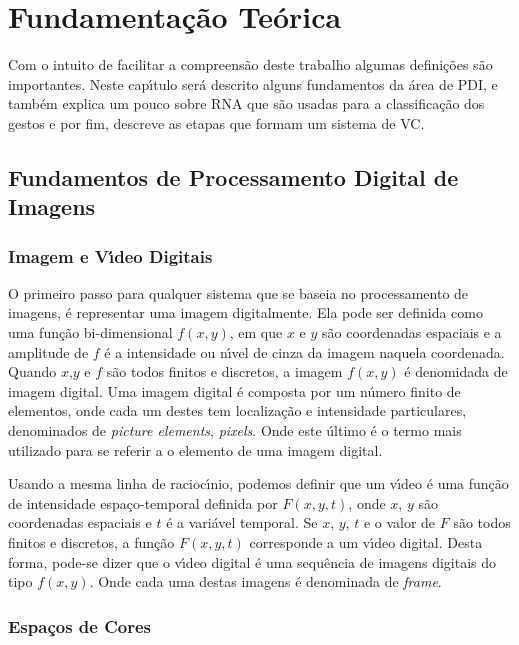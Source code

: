\chapter{Fundamenta\c{c}\~{a}o Te\'{o}rica} \label{CHP:REVI}%

Com o intuito de facilitar a compreens\~{a}o deste trabalho algumas defini\c{c}\~{o}es s\~{a}o importantes. Neste cap\'{\i}tulo ser\'{a} descrito alguns 
fundamentos da \'{a}rea de \ac{PDI}, e tamb\'{e}m explica um pouco sobre \ac{RNA} que s\~{a}o usadas para a classifica\c{c}\~{a}o dos gestos e por 
fim, descreve as etapas que formam um sistema de \ac{VC}.

\section{Fundamentos de Processamento Digital de Imagens}

\subsection{Imagem e V\'{\i}deo Digitais}

O primeiro passo para qualquer sistema que se baseia no processamento de imagens, \'{e} representar uma imagem digitalmente. Ela pode 
ser definida como uma fun\c{c}\~{a}o bi-dimensional $f(x,y)$, em que $x$ e $y$  s\~{a}o coordenadas espaciais e a amplitude de $f$ \'{e} a 
intensidade ou n\'{\i}vel de cinza da imagem naquela coordenada. Quando $x$,$y$ e $f$ s\~{a}o todos finitos e discretos, a imagem $f(x,y)$ 
\'{e} denomidada de imagem digital. Uma imagem digital \'{e} composta por um n\'{u}mero finito de elementos, onde cada um destes tem 
localiza\c{c}\~{a}o e intensidade particulares, denominados de \emph{picture elements}, \emph{pixels}. Onde este \'{u}ltimo \'{e} o termo mais 
utilizado para se referir a o elemento de uma imagem digital\cite{GONZALEZ:2008}.

Usando a mesma linha de racioc\'{\i}nio, podemos definir que um v\'{\i}deo \'{e} uma fun\c{c}\~{a}o de intensidade espa\c{c}o-temporal definida por 
$F(x,y,t)$, onde $x$, $y$ s\~{a}o coordenadas espaciais e $t$ \'{e} a vari\'{a}vel temporal. Se $x$, $y$, $t$ e o valor de $F$ s\~{a}o todos 
finitos e discretos, a fun\c{c}\~{a}o $F(x,y,t)$ corresponde a um v\'{\i}deo digital. Desta forma, pode-se dizer que o v\'{\i}deo digital \'{e} uma 
sequ\^{e}ncia de imagens digitais do tipo $f(x,y)$. Onde cada uma destas imagens \'{e} denominada de \emph{frame}\cite{TEKALP:1995}.

\subsection{Espa\c{c}os de Cores}

